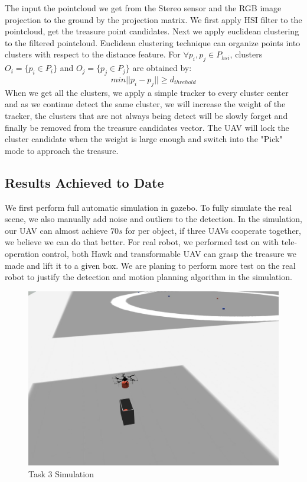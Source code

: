 \documentclass{standalone}
\begin{document}
The input the pointcloud we get from the Stereo sensor and the RGB image projection to the ground by the projection matrix. We first apply HSI filter to the pointcloud, get the treasure point candidates. Next we apply euclidean clustering to the filtered pointcloud. Euclidean clustering technique can organize points into clusters with respect to the distance feature. For $\forall p_i, p_j \in P_{hsi}$, clusters $O_i = \{p_i \in P_i\}$ and $O_j = \{p_j \in P_j\}$ are obtained by:
\begin{equation}\label{eq3-1}
min||p_i - p_j|| \geq d_{threhold} 
\end{equation}
When we get all the clusters, we apply a simple tracker to every cluster center and as we continue detect the same cluster, we will increase the weight of the tracker, the clusters that are not always being detect will be slowly forget and finally be removed from the treasure candidates vector. The UAV will lock the cluster candidate when the weight is large enough and switch into the "Pick" mode to approach the treasure.

\subsection{Results Achieved to Date}
We first perform full automatic simulation in gazebo. To fully simulate the real scene, we also manually add noise and outliers to the detection. In the simulation, our UAV can almost achieve $70s$ for per object, if three UAVs cooperate together, we believe we can do that better. For real robot, we performed test on with tele-operation control, both Hawk and transformable UAV can grasp the treasure we made and lift it to a given box. We are planing to perform more test on the real robot to justify the detection and motion planning algorithm in the simulation.


    
     \begin{figure}%
    \begin{center}
        \includegraphics[keepaspectratio=true, width=1\linewidth, height=0.20\textheight]{img//t3simu.jpg}
      \end{center}
    \caption{Task 3 Simulation}
    \label{t3state}
    \end{figure}
\end{document}
